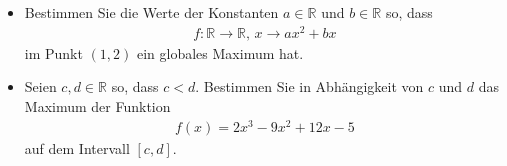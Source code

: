 \documentclass[12pt]{article}
\newcommand{\R}{\mathbb{R}} %
\newenvironment{question}[2][\textcolor{red}{Aufgabe}]{\begin{trivlist}
        \item[\hskip \labelsep {\bfseries \textcolor{red}{#1}}\hskip \labelsep {\bfseries \textcolor{red}{#2}.}]}{\end{trivlist}}
\begin{document}
\begin{question}{2}
    \begin{itemize}
        \item[(a)]Bestimmen Sie die Werte der Konstanten $a \in \R$ und $b \in \R$ so, dass
              \begin{align*}
                  f : \R \to \R,\, x \to ax^2 + bx
              \end{align*}
              im Punkt $(1, 2)$ ein globales Maximum hat.
        \item[(b)] Seien $c, d \in \R$ so, dass $c < d$. Bestimmen Sie in Abhängigkeit von $c$ und $d$ das Maximum
              der Funktion
              \begin{align*}
                  f(x) = 2x^3-9x^2+12x - 5
              \end{align*}
              auf dem Intervall $[c, d]$.
    \end{itemize}
\end{question}
\end{document}
